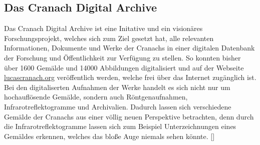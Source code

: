\documentclass[a4paper,12pt,oneside]{article}
\begin{document}
    \subsection{Das Cranach Digital Archive}
      Das Cranach Digital Archive ist eine Initative und ein visionäres Forschungsprojekt, 
      welches sich zum Ziel gesetzt hat, alle relevanten Informationen, Dokumente und 
      Werke der Cranachs in einer digitalen Datenbank der Forschung und Öffentlichkeit zur 
      Verfügung zu stellen.
      So konnten bisher über 1600 Gemälde und 14000 Abbildungen digitalisiert und auf der 
      Webseite \url{lucascranach.org} veröffentlich werden, welche frei über das
      Internet zugänglich ist.
      Bei den digitaliserten Aufnahmen der Werke handelt es sich nicht nur um hochauflösende
      Gemälde, sondern auch Röntgenaufnahmen, Infrarotreflektogramme und
      Archivalien. Dadurch lassen sich verschiedene
      Gemälde der Cranachs aus einer völlig neuen Perspektive betrachten, denn durch die
      Infrarotreflektogramme lassen sich zum Beispiel Unterzeichnungen
      eines Gemäldes erkennen, welches das bloße Auge niemals sehen könnte. [\cite{heydenreich2017lucas}]
\end{document}
